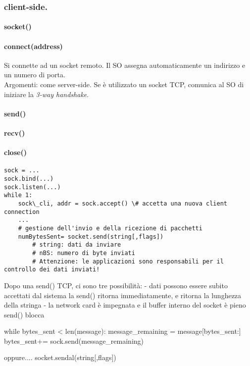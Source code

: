 \begin{minipage}[t]{0.1\textwidth}\hfill
\end{minipage}
\begin{minipage}[t]{0.45\textwidth}
\subsubsection{client-side.}
\paragraph{socket()}
\paragraph{connect(address)} Si connette ad un socket remoto. Il SO assegna automaticamente un indirizzo e un numero di porta.\\
Argomenti: come server-side.
Se è utilizzato un socket TCP, comunica al SO di iniziare la \textit{3-way handshake}.
\paragraph{send()}
\paragraph{recv()}
\paragraph{close()}
\hfill

\begin{lstlisting}
sock = ...
sock.bind(...)
sock.listen(...)
while 1:
	sock\_cli, addr = sock.accept() \# accetta una nuova client connection
	...
	# gestione dell'invio e della ricezione di pacchetti
	numBytesSent= socket.send(string[,flags])
		# string: dati da inviare
		# nBS: numero di byte inviati
		# Attenzione: le applicazioni sono responsabili per il controllo dei dati inviati!
\end{lstlisting}


Dopo una send() TCP, ci sono tre possibilità:
	- dati possono essere subito accettati dal sistema
		la send() ritorna immediatamente, e ritorna la lunghezza della stringa
	- la network card è impegnata e il buffer interno del socket è pieno
		send() blocca 

	while bytes\_sent < len(message):
		message\_remaining = message[bytes\_sent:]
		bytes\_sent+= sock.send(message\_remaining)

oppure....
	socket.sendal(string[,flags])
\end{minipage}

